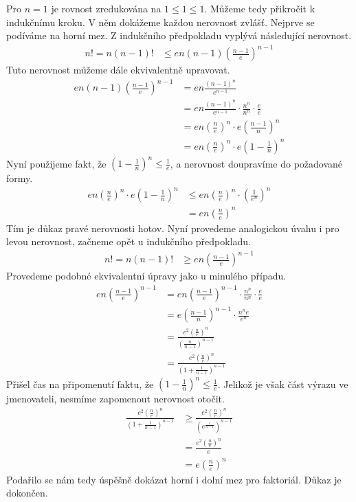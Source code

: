 \begin{t_proof}
  Pro $n=1$ je rovnost zredukována na $1\leq 1\leq 1$. Můžeme tedy přikročit k indukčnímu kroku. V něm dokážeme každou nerovnost zvlášť. Nejprve se podíváme na horní mez. Z indukčního předpokladu vyplývá následující nerovnost.
  \begin{align*}
    n! = n(n-1)! &\leq en(n-1)\left(\frac{n-1}{e}\right)^{n-1}
  \end{align*}
  Tuto nerovnost můžeme dále ekvivalentně upravovat.
  \begin{align*}
    en(n-1)\left(\frac{n-1}{e}\right)^{n-1}
    &= en\frac{(n-1)^n}{e^{n-1}}\\
    &= en\frac{(n-1)^n}{e^{n-1}}\cdot\frac{n^n}{n^n}\cdot\frac{e}{e}\\
    &= en\left(\frac{n}{e}\right)^n\cdot e\left(\frac{n-1}{n}\right)^n\\
    &= en\left(\frac{n}{e}\right)^n\cdot e\left(1-\frac{1}{n}\right)^n
  \end{align*}
  Nyní použijeme fakt, že $\left(1-\frac{1}{n}\right)^n\leq \frac{1}{e}$, a nerovnost doupravíme do požadované formy.
  \begin{align*}
    en\left(\frac{n}{e}\right)^n\cdot e\left(1-\frac{1}{n}\right)^n
    &\leq en\left(\frac{n}{e}\right)^n\cdot \left(\frac{1}{e^n}\right)^n\\
    &= en\left(\frac{n}{e}\right)^n
  \end{align*}
  Tím je důkaz pravé nerovnosti hotov. Nyní provedeme analogickou úvahu i pro levou nerovnost, začneme opět u indukčního předpokladu.
  \begin{align*}
    n! = n(n-1)! &\geq en\left(\frac{n-1}{e}\right)^{n-1}
  \end{align*}
  Provedeme podobné ekvivalentní úpravy jako u minulého případu.
  \begin{align*}
    en\left(\frac{n-1}{e}\right)^{n-1}
    &= en\left(\frac{n-1}{e}\right)^{n-1}\cdot\frac{n^n}{n^n}\cdot\frac{e}{e}\\
    &= e\left(\frac{n-1}{n}\right)^{n-1}\cdot\frac{n^ne}{e^{n}}\\
    &= \frac{e^2\left(\frac{n}{e}\right)^n}{\left(\frac{n}{n-1}\right)^{n-1}}\\
    &= \frac{e^2\left(\frac{n}{e}\right)^n}{\left(1+\frac{1}{n-1}\right)^{n-1}}
  \end{align*}
  Přišel čas na připomenutí faktu, že $\left(1-\frac{1}{n}\right)^n\leq \frac{1}{e}$. Jelikož je však část výrazu ve jmenovateli, nesmíme zapomenout nerovnost otočit.
  \begin{align*}
    \frac{e^2\left(\frac{n}{e}\right)^n}{\left(1+\frac{1}{n-1}\right)^{n-1}}
    &\geq \frac{e^2\left(\frac{n}{e}\right)^n}{\left(e^{\frac{1}{n-1}}\right)^{n-1}}\\
    &= \frac{e^2\left(\frac{n}{e}\right)^n}{e}\\
    &= e\left(\frac{n}{e}\right)^n
  \end{align*}
  Podařilo se nám tedy úspěšně dokázat horní i dolní mez pro faktoriál. Důkaz je dokončen.
\end{t_proof}


